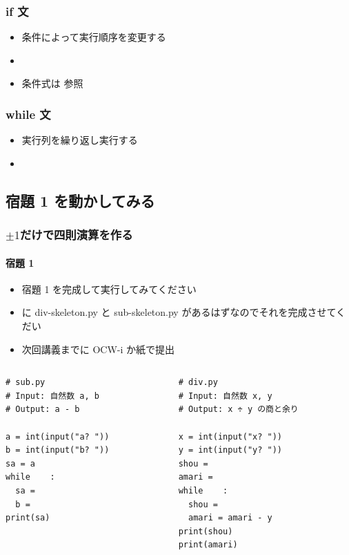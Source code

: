 \begin{frame}[fragile,label=if]
\frametitle{if 文}
  \begin{itemize}
\item 条件によって実行順序を変更する
\item \hyperlink{gcd}{}
\item 条件式は \href{https://docs.python.org/ja/3/reference/expressions.html#comparisons}{}参照
  \end{itemize}
\end{frame}
\begin{frame}[fragile,label=while]
\frametitle{while 文}
  \begin{itemize}
\item 実行列を繰り返し実行する
\item \hyperlink{mult}{}
  \end{itemize}
\end{frame}
\subsection{宿題 1 を動かしてみる}
\begin{frame}
\frametitle{$\pm 1$だけで四則演算を作る}
\framesubtitle{宿題 1}
  \begin{itemize}
\item 宿題 1 を完成して実行してみてください
\item \href{https://sites.google.com/a/presystems.xyz/sample/home/elementary-computer-science}{} に div-skeleton.py と sub-skeleton.py があるはずなのでそれを完成させてくだい
\item 次回講義までに OCW-i か紙で提出
  \end{itemize}
  \begin{columns}
    \begin{column}{0.45\textwidth}
      \begin{lstlisting}[caption={sub.py},label=lst:sub]
# sub.py
# Input: 自然数 a, b
# Output: a - b

a = int(input("a? "))
b = int(input("b? "))
sa = a               
while    :
  sa = 
  b = 
print(sa)
      \end{lstlisting}
    \end{column}
    \begin{column}{0.45\textwidth}
      \begin{lstlisting}[caption={div.py},label=lst:div]
# div.py
# Input: 自然数 x, y
# Output: x ÷ y の商と余り

x = int(input("x? "))
y = int(input("y? "))
shou = 
amari = 
while    :
  shou = 
  amari = amari - y
print(shou)
print(amari)
      \end{lstlisting}
    \end{column}
  \end{columns}
\end{frame}
%
%
